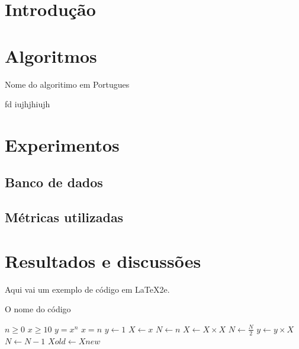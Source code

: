 
\section{Introdução}

\lipsum[2-4]

\section{Algoritmos}

\begin{algorithm}[H]
  \caption{Nome do algoritimo em Portugues}
    {
    fd}
    {iujhjhiujh}

\end{algorithm}

\section{Experimentos}

\lipsum[2-4]

\subsection{Banco de dados}

\lipsum[2-4]

\subsection{Métricas utilizadas}

\lipsum[2-4]

\section{Resultados e discussões}
\par Aqui vai um exemplo de código em \LaTeX2e.

\begin{algorithm} [H]
	\caption{O nome do código}\label{alg:cap}

	\begin{algorithmic} [H]
		\Require $n \geq 0$	
    \Require $x \geq 10$	
		\Ensure $y = x^n$   	
    \Ensure $x = n $      
		\State $y \gets 1$
		\State $X \gets x$
		\State $N \gets n$
			 	   \State $X \gets X \times X$
 			   	\State $N \gets \frac{N}{2}$  
   				 \State $y \gets y \times X$
  			 	 \State $N \gets N - 1$
				\State $Xold \gets Xnew$
			\EndIf
		\EndWhile
	\end{algorithmic}

\end{algorithm}


